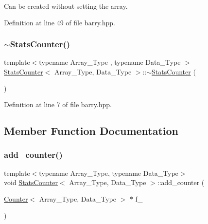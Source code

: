 Can be created without setting the array. 



Definition at line 49 of file barry.\+hpp.

\mbox{\label{classbarry_1_1_stats_counter_a2824d86765d94e909e4b33396250b6c7}} 
\subsubsection{\texorpdfstring{$\sim$\+Stats\+Counter()}{~StatsCounter()}}
{\footnotesize\ttfamily template$<$typename Array\+\_\+\+Type , typename Data\+\_\+\+Type $>$ \\
\hyperlink{classbarry_1_1_stats_counter}{Stats\+Counter}$<$ Array\+\_\+\+Type, Data\+\_\+\+Type $>$\+::$\sim$\hyperlink{classbarry_1_1_stats_counter}{Stats\+Counter} (\begin{DoxyParamCaption}{ }\end{DoxyParamCaption})\hspace{0.3cm}{\ttfamily [inline]}}



Definition at line 7 of file barry.\+hpp.



\subsection{Member Function Documentation}
\mbox{\label{classbarry_1_1_stats_counter_a829e41243a7b18cf71337deeec9f7030}} 
\subsubsection{\texorpdfstring{add\+\_\+counter()}{add\_counter()}\hspace{0.1cm}{\footnotesize\ttfamily [1/2]}}
{\footnotesize\ttfamily template$<$typename Array\+\_\+\+Type, typename Data\+\_\+\+Type$>$ \\
void \hyperlink{classbarry_1_1_stats_counter}{Stats\+Counter}$<$ Array\+\_\+\+Type, Data\+\_\+\+Type $>$\+::add\+\_\+counter (\begin{DoxyParamCaption}\item[{\hyperlink{classbarry_1_1_counter}{Counter}$<$ Array\+\_\+\+Type, Data\+\_\+\+Type $>$ $\ast$}]{f\+\_\+ }\end{DoxyParamCaption})\hspace{0.3cm}{\ttfamily [inline]}}



